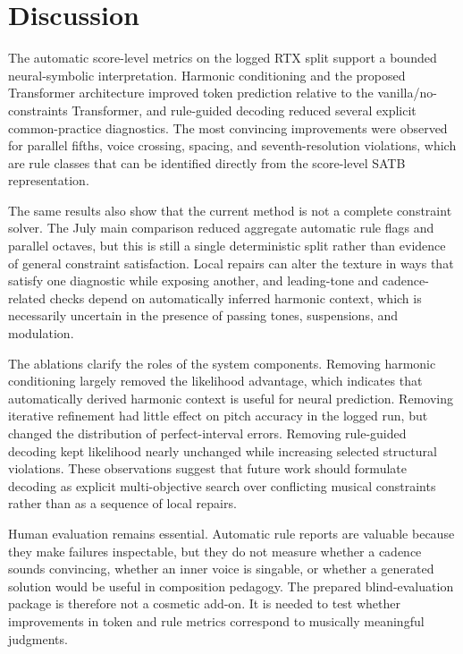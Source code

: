 \section{Discussion}

The automatic score-level metrics on the logged RTX split support a bounded neural-symbolic interpretation. Harmonic conditioning and the proposed Transformer architecture improved token prediction relative to the vanilla/no-constraints Transformer, and rule-guided decoding reduced several explicit common-practice diagnostics. The most convincing improvements were observed for parallel fifths, voice crossing, spacing, and seventh-resolution violations, which are rule classes that can be identified directly from the score-level SATB representation.

The same results also show that the current method is not a complete constraint solver. The July main comparison reduced aggregate automatic rule flags and parallel octaves, but this is still a single deterministic split rather than evidence of general constraint satisfaction. Local repairs can alter the texture in ways that satisfy one diagnostic while exposing another, and leading-tone and cadence-related checks depend on automatically inferred harmonic context, which is necessarily uncertain in the presence of passing tones, suspensions, and modulation.

The ablations clarify the roles of the system components. Removing harmonic conditioning largely removed the likelihood advantage, which indicates that automatically derived harmonic context is useful for neural prediction. Removing iterative refinement had little effect on pitch accuracy in the logged run, but changed the distribution of perfect-interval errors. Removing rule-guided decoding kept likelihood nearly unchanged while increasing selected structural violations. These observations suggest that future work should formulate decoding as explicit multi-objective search over conflicting musical constraints rather than as a sequence of local repairs.

Human evaluation remains essential. Automatic rule reports are valuable because they make failures inspectable, but they do not measure whether a cadence sounds convincing, whether an inner voice is singable, or whether a generated solution would be useful in composition pedagogy. The prepared blind-evaluation package is therefore not a cosmetic add-on. It is needed to test whether improvements in token and rule metrics correspond to musically meaningful judgments.
